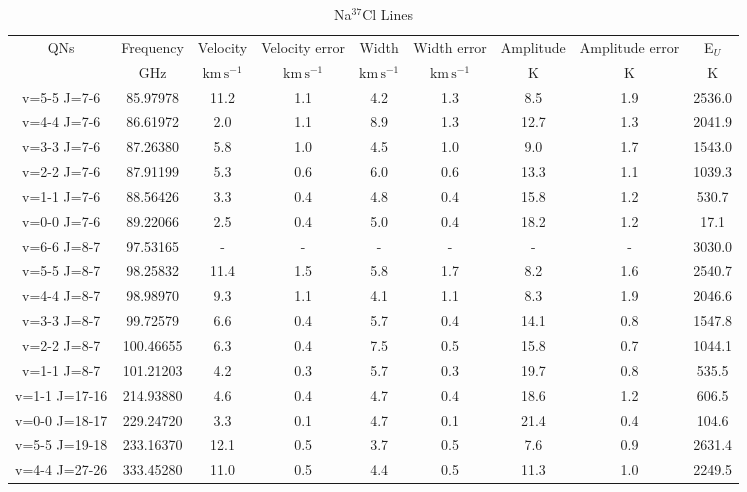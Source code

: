 \begin{table*}[htp]
\centering
\caption{Na$^{37}$Cl Lines}
\begin{tabular}{ccccccccc}
\label{tab:Na37Cl_salt_lines}
QNs & Frequency & Velocity & Velocity error & Width & Width error & Amplitude & Amplitude error & E$_U$ \\
 & $\mathrm{GHz}$ & $\mathrm{km\,s^{-1}}$ & $\mathrm{km\,s^{-1}}$ & $\mathrm{km\,s^{-1}}$ & $\mathrm{km\,s^{-1}}$ & $\mathrm{K}$ & $\mathrm{K}$ & $\mathrm{K}$ \\
\hline
v=5-5 J=7-6 & 85.97978 & 11.2 & 1.1 & 4.2 & 1.3 & 8.5 & 1.9 & 2536.0 \\
v=4-4 J=7-6 & 86.61972 & 2.0 & 1.1 & 8.9 & 1.3 & 12.7 & 1.3 & 2041.9 \\
v=3-3 J=7-6 & 87.26380 & 5.8 & 1.0 & 4.5 & 1.0 & 9.0 & 1.7 & 1543.0 \\
v=2-2 J=7-6 & 87.91199 & 5.3 & 0.6 & 6.0 & 0.6 & 13.3 & 1.1 & 1039.3 \\
v=1-1 J=7-6 & 88.56426 & 3.3 & 0.4 & 4.8 & 0.4 & 15.8 & 1.2 & 530.7 \\
v=0-0 J=7-6 & 89.22066 & 2.5 & 0.4 & 5.0 & 0.4 & 18.2 & 1.2 & 17.1 \\
v=6-6 J=8-7 & 97.53165 & - & - & - & - & - & - & 3030.0 \\
v=5-5 J=8-7 & 98.25832 & 11.4 & 1.5 & 5.8 & 1.7 & 8.2 & 1.6 & 2540.7 \\
v=4-4 J=8-7 & 98.98970 & 9.3 & 1.1 & 4.1 & 1.1 & 8.3 & 1.9 & 2046.6 \\
v=3-3 J=8-7 & 99.72579 & 6.6 & 0.4 & 5.7 & 0.4 & 14.1 & 0.8 & 1547.8 \\
v=2-2 J=8-7 & 100.46655 & 6.3 & 0.4 & 7.5 & 0.5 & 15.8 & 0.7 & 1044.1 \\
v=1-1 J=8-7 & 101.21203 & 4.2 & 0.3 & 5.7 & 0.3 & 19.7 & 0.8 & 535.5 \\
v=1-1 J=17-16 & 214.93880 & 4.6 & 0.4 & 4.7 & 0.4 & 18.6 & 1.2 & 606.5 \\
v=0-0 J=18-17 & 229.24720 & 3.3 & 0.1 & 4.7 & 0.1 & 21.4 & 0.4 & 104.6 \\
v=5-5 J=19-18 & 233.16370 & 12.1 & 0.5 & 3.7 & 0.5 & 7.6 & 0.9 & 2631.4 \\
v=4-4 J=27-26 & 333.45280 & 11.0 & 0.5 & 4.4 & 0.5 & 11.3 & 1.0 & 2249.5 \\
\hline
\end{tabular}

\par 
\end{table*}
